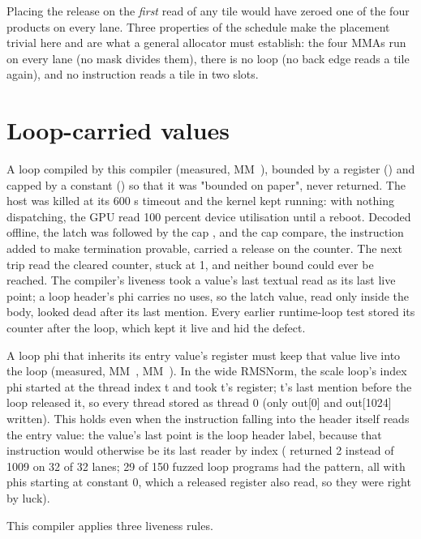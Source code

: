 Placing the release on the \emph{first} read of any tile would have zeroed one of the four products on every lane. Three properties
of the schedule make the placement trivial here and are what a general allocator must establish: the four MMAs run on
every lane (no mask divides them), there is no loop (no back edge reads a tile again), and no instruction reads a tile in
two slots.

\section{Loop-carried values}\label{sec:loops-loop-variable-rule}

A loop compiled by this compiler (measured, MM~), bounded by a register
() and capped by a constant () so that it was "bounded on paper", never returned. The host was killed
at its 600 s timeout and the kernel kept running: with nothing dispatching, the GPU read 100 percent device utilisation
until a reboot. Decoded offline, the latch was  followed by the cap
, and the cap compare, the instruction added to make termination provable, carried a release on the
counter. The next trip read the cleared counter,  stuck at 1, and neither bound could ever be reached.
The compiler's liveness took a value's last textual read as its last live point; a loop header's phi carries no uses, so
the latch value, read only inside the body, looked dead after its last mention. Every earlier runtime-loop test stored its
counter after the loop, which kept it live and hid the defect.

A loop phi that inherits its entry value's register must keep
that value live into the loop (measured, MM~, MM~). In the wide RMSNorm, the scale loop's index phi started at the thread index t and took
t's register; t's last mention before the loop released it, so every thread stored as thread 0 (only out{[}0{]} and out{[}1024{]}
written). This holds even when the instruction falling into the header itself reads the entry value: the value's last
point is the loop header label, because that instruction would otherwise be its last reader by index ( returned 2 instead of 1009 on 32 of 32 lanes; 29 of 150 fuzzed loop programs had the pattern, all with
phis starting at constant 0, which a released register also read, so they were right by luck).

This compiler applies three liveness rules.

